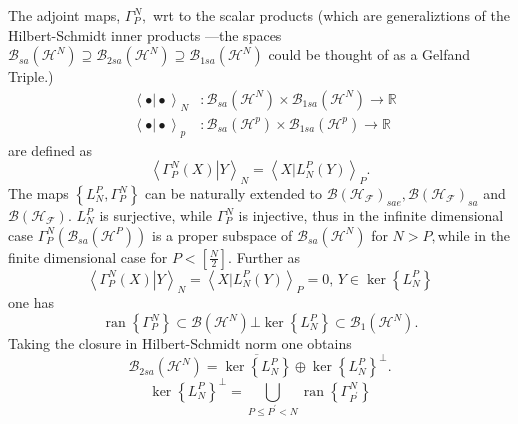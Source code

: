 \documentclass[aps,preprint]{revtex4}%
\begin{document}
The adjoint maps, $\Gamma_{P}^{N},$ wrt to the scalar products (which are
generaliztions of the Hilbert-Schmidt inner products ---the spaces
$\mathcal{B}_{sa}\left(  \mathcal{H}^{N}\right)  \supseteq\mathcal{B}%
_{2sa}\left(  \mathcal{H}^{N}\right)  \supseteq\mathcal{B}_{1sa}\left(
\mathcal{H}^{N}\right)  $ could be thought of as a Gelfand Triple.)
\begin{align}
\text{ }\left\langle \left.  \bullet\right\vert \bullet\right\rangle _{N}  &
:\mathcal{B}_{sa}\left(  \mathcal{H}^{N}\right)  \times\mathcal{B}%
_{1sa}\left(  \mathcal{H}^{N}\right)  \rightarrow\mathbb{R}\\
\text{ }\left\langle \left.  \bullet\right\vert \bullet\right\rangle _{p}  &
:\mathcal{B}_{sa}\left(  \mathcal{H}^{p}\right)  \times\mathcal{B}%
_{1sa}\left(  \mathcal{H}^{p}\right)  \rightarrow\mathbb{R}%
\end{align}
are defined as
\begin{equation}
\left\langle \left.  \Gamma_{P}^{N}\left(  X\right)  \right\vert
Y\right\rangle _{N}=\left\langle \left.  X\right\vert L_{N}^{P}\left(
Y\right)  \right\rangle _{P}.
\end{equation}
The maps $\left\{  L_{N}^{P},\Gamma_{P}^{N}\right\}  $ can be naturally
extended to $\mathcal{B}\left(  \mathcal{H}_{\mathcal{F}}\right)
_{sae},\mathcal{B}\left(  \mathcal{H}_{\mathcal{F}}\right)  _{sa}$ and
$\mathcal{B}\left(  \mathcal{H}_{\mathcal{F}}\right)  .$ $L_{N}^{P}$ is
surjective, while $\Gamma_{P}^{N}$ is injective, thus in the infinite
dimensional case $\Gamma_{P}^{N}\left(  \mathcal{B}_{sa}\left(  \mathcal{H}%
^{P}\right)  \right)  $ is a proper subspace of $\mathcal{B}_{sa}\left(
\mathcal{H}^{N}\right)  $ for $N>P,$while in the finite dimensional case for
$P<\left[  \frac{N}{2}\right]  .$ Further as
\begin{equation}
\left\langle \left.  \Gamma_{P}^{N}\left(  X\right)  \right\vert
Y\right\rangle _{N}=\left\langle \left.  X\right\vert L_{N}^{P}\left(
Y\right)  \right\rangle _{P}=0,\,Y\in\ker\left\{  L_{N}^{P}\right\}
\end{equation}
one has
\begin{equation}
\operatorname*{ran}\left\{  \Gamma_{P}^{N}\right\}  \subset\mathcal{B}\left(
\mathcal{H}^{N}\right)  \bot\ker\left\{  L_{N}^{P}\right\}  \subset
\mathcal{B}_{1}\left(  \mathcal{H}^{N}\right)  .
\end{equation}
Taking the closure in Hilbert-Schmidt norm one obtains
\begin{equation}
\mathcal{B}_{2sa}\left(  \mathcal{H}^{N}\right)  =\overline{\ker\left\{
L_{N}^{P}\right\}  }\oplus\ker\left\{  L_{N}^{P}\right\}  ^{\bot}.
\end{equation}%
\begin{equation}
\ker\left\{  L_{N}^{P}\right\}  ^{\bot}=%
{\displaystyle\bigcup\limits_{P\leq P^{\prime}<N}}
\operatorname*{ran}\left\{  \Gamma_{P^{\prime}}^{N}\right\}
\end{equation}
\end{document}

